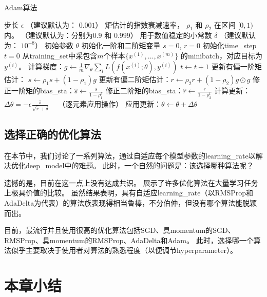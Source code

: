 \begin{algorithm}[ht]
	\caption{Adam算法}
	\label{alg:adam}
	\begin{algorithmic}
		\REQUIRE 步长 $\epsilon$ （建议默认为： $0.001$）
		\REQUIRE 矩估计的指数衰减速率， $\rho_1$ 和 $\rho_2$ 在区间 $[0, 1)$内。
		（建议默认为：分别为$0.9$ 和 $0.999$）
		\REQUIRE 用于数值稳定的小常数 $\delta$  （建议默认为： $10^{-8}$）
		\REQUIRE 初始参数 $\theta$
		\STATE 初始化一阶和二阶矩变量 $s = 0 $, $r = 0$
		\STATE 初始化\gls{time_step} $t=0$ 
		\STATE 从\gls{training_set}中采包含$m$个样本$\{ x^{(1)},\dots, x^{(m)}\}$ 的\gls{minibatch}，对应目标为$y^{(i)}$。
		\STATE 计算梯度：$g \leftarrow \frac{1}{m} \nabla_{\theta} \sum_i L(f(x^{(i)};\theta),y^{(i)})$ 
		\STATE $t \leftarrow t + 1$
		\STATE 更新有偏一阶矩估计： $s \leftarrow \rho_1 s + (1-\rho_1) g$
		\STATE 更新有偏二阶矩估计：$r \leftarrow \rho_2 r + (1-\rho_2)  g \odot g$
		\STATE 修正一阶矩的\gls{bias_sta}：$\hat{s} \leftarrow \frac{s}{1-\rho_1^t}$
		\STATE 修正二阶矩的\gls{bias_sta}：$\hat{r} \leftarrow \frac{r}{1-\rho_2^t}$
		\STATE 计算更新：$\Delta \theta = - \epsilon \frac{\hat{s}}{\sqrt{\hat{r}} + \delta}$ \ \  （逐元素应用操作）
		\STATE 应用更新：$\theta \leftarrow \theta + \Delta \theta$
		\ENDWHILE
	\end{algorithmic}
\end{algorithm}

\subsection{选择正确的优化算法}
\label{sec:choosing_the_right_optimization_algorithms}
在本节中，我们讨论了一系列算法，通过自适应每个模型参数的\gls{learning_rate}以解决优化\gls{deep_model}中的难题。
此时，一个自然的问题是：该选择哪种算法呢？

遗憾的是，目前在这一点上没有达成共识。
\cite{Schaul2014_unittests}展示了许多优化算法在大量学习任务上极具价值的比较。
虽然结果表明，具有自适应\gls{learning_rate}（以RMSProp和AdaDelta为代表）的算法族表现得相当鲁棒，不分伯仲，但没有哪个算法能脱颖而出。

目前，最流行并且使用很高的优化算法包括SGD、具\gls{momentum}的SGD、RMSProp、具\gls{momentum}的RMSProp、AdaDelta和Adam。
此时，选择哪一个算法似乎主要取决于使用者对算法的熟悉程度（以便调节\gls{hyperparameter}）。

\section{本章小结}